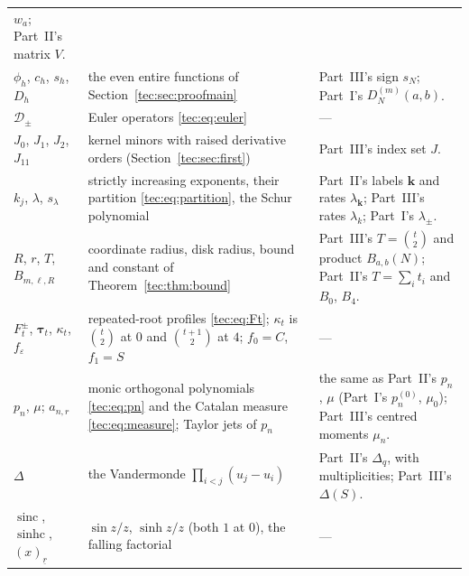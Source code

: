 \documentclass[11pt,a4paper]{article}
\numberwithin{equation}{section}
\theoremstyle{definition}
\theoremstyle{remark}
\newcommand{\bk}{\boldsymbol{k}}
\newcommand{\Del}{\Delta}
\newcommand{\sinc}{\operatorname{sinc}}
\newcommand{\sinhc}{\operatorname{sinhc}}
\newcommand{\fall}[2]{(#1)_{\underline{#2}}}
\begin{document}
\begin{longtable}{@{}>{\raggedright}p{}>{\raggedright}p{}>{\raggedright\arraybackslash}p{}@{}}
   $w_a$; Part~II's matrix $V$.\\
$\phi_h$, $c_h$, $s_h$, $D_h$
 & the even entire functions of Section~\ref{tec:sec:proofmain}
 & Part~III's sign $s_N$; Part~I's $D_N^{(m)}(a,b)$.\\
$\mathcal D_\pm$
 & Euler operators \eqref{tec:eq:euler}
 & ---\\
$J_0$, $J_1$, $J_2$, $J_{11}$
 & kernel minors with raised derivative orders (Section~\ref{tec:sec:first})
 & Part~III's index set $J$.\\
$k_j$, $\lambda$, $s_\lambda$
 & strictly increasing exponents, their partition \eqref{tec:eq:partition},
   the Schur polynomial
 & Part~II's labels $\bk$ and rates $\lambda_{\bk}$; Part~III's rates
   $\lambda_k$; Part~I's $\lambda_\pm$.\\
$R$, $r$, $T$, $B_{m,\ell,R}$
 & coordinate radius, disk radius, bound and constant of
   Theorem~\ref{tec:thm:bound}
 & Part~III's $T=\binom t2$ and product $B_{a,b}(N)$; Part~II's
   $T=\sum_it_i$ and $B_0$, $B_4$.\\
$F_t^\pm$, $\boldsymbol\tau_t$, $\kappa_t$, $f_\varepsilon$
 & repeated-root profiles \eqref{tec:eq:Ft}; $\kappa_t$ is $\binom t2$ at $0$
   and $\binom{t+1}2$ at $4$; $f_0=C$, $f_1=S$
 & ---\\
$p_n$, $\mu$; $a_{n,r}$
 & monic orthogonal polynomials \eqref{tec:eq:pn} and the Catalan measure
   \eqref{tec:eq:measure}; Taylor jets of $p_n$
 & the same as Part~II's $p_n$, $\mu$ (Part~I's $p_n^{(0)}$, $\mu_0$);
   Part~III's centred moments $\mu_n$.\\
$\Del$
 & the Vandermonde $\prod_{i<j}(u_j-u_i)$
 & Part~II's $\Delta_q$, with multiplicities; Part~III's $\Delta(S)$.\\
$\sinc$, $\sinhc$, $\fall xr$
 & $\sin z/z$, $\sinh z/z$ (both $1$ at $0$), the falling factorial
 & ---\\
\end{longtable}
\endgroup
\end{document}
